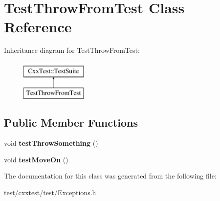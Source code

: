 \hypertarget{classTestThrowFromTest}{\section{Test\-Throw\-From\-Test Class Reference}
\label{classTestThrowFromTest}
}
Inheritance diagram for Test\-Throw\-From\-Test\-:\begin{figure}[H]
\begin{center}
\leavevmode
\includegraphics[height=2.000000cm]{classTestThrowFromTest}
\end{center}
\end{figure}
\subsection*{Public Member Functions}
\begin{DoxyCompactItemize}
\item 
\hypertarget{classTestThrowFromTest_af26f3270ba469646f98f5f8eac92fa53}{void {\bfseries test\-Throw\-Something} ()}\label{classTestThrowFromTest_af26f3270ba469646f98f5f8eac92fa53}

\item 
\hypertarget{classTestThrowFromTest_a6dc528cf675bf765ac822d242d5e6ec1}{void {\bfseries test\-Move\-On} ()}\label{classTestThrowFromTest_a6dc528cf675bf765ac822d242d5e6ec1}

\end{DoxyCompactItemize}


The documentation for this class was generated from the following file\-:\begin{DoxyCompactItemize}
\item 
test/cxxtest/test/Exceptions.\-h\end{DoxyCompactItemize}

